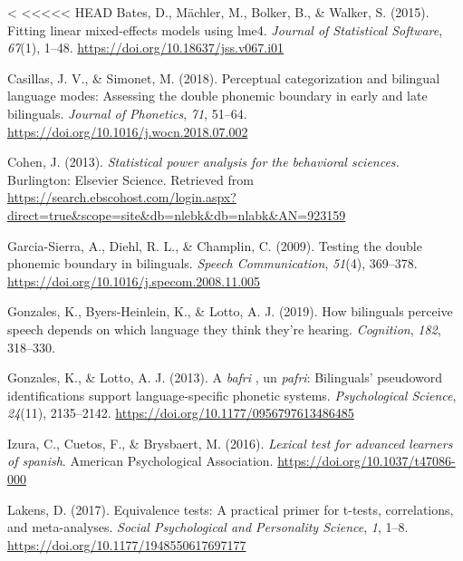 \documentclass[
  english,
  man]{apa6}
\newlength{\cslhangindent}
\newenvironment{CSLReferences}[2] %
 {%
  \setlength{\parindent}{0pt}
  \ifodd #1 \everypar{\setlength{\hangindent}{\cslhangindent}}\ignorespaces\fi
  \ifnum #2 > 0
  \setlength{\parskip}{#2\baselineskip}
  \fi
 }%
 {}
\begin{document}
\hypertarget{refs}{}
\begin{CSLReferences}{1}{0}
<<<<<<< HEAD
\leavevmode{}%
Bates, D., Mächler, M., Bolker, B., \& Walker, S. (2015). Fitting linear mixed-effects models using {lme4}. \emph{Journal of Statistical Software}, \emph{67}(1), 1--48. \url{https://doi.org/10.18637/jss.v067.i01}

\leavevmode{}%
Casillas, J. V., \& Simonet, M. (2018). Perceptual categorization and bilingual language modes: Assessing the double phonemic boundary in early and late bilinguals. \emph{Journal of Phonetics}, \emph{71}, 51--64. \url{https://doi.org/10.1016/j.wocn.2018.07.002}

\leavevmode{}%
Cohen, J. (2013). \emph{Statistical power analysis for the behavioral sciences.} Burlington: Elsevier Science. Retrieved from \url{https://search.ebscohost.com/login.aspx?direct=true\&scope=site\&db=nlebk\&db=nlabk\&AN=923159}

\leavevmode{}%
Garcia-Sierra, A., Diehl, R. L., \& Champlin, C. (2009). Testing the double phonemic boundary in bilinguals. \emph{Speech Communication}, \emph{51}(4), 369--378. \url{https://doi.org/10.1016/j.specom.2008.11.005}

\leavevmode{}%
Gonzales, K., Byers-Heinlein, K., \& Lotto, A. J. (2019). How bilinguals perceive speech depends on which language they think they're hearing. \emph{Cognition}, \emph{182}, 318--330.

\leavevmode{}%
Gonzales, K., \& Lotto, A. J. (2013). A \emph{bafri} , un \emph{pafri}: Bilinguals' pseudoword identifications support language-specific phonetic systems. \emph{Psychological Science}, \emph{24}(11), 2135--2142. \url{https://doi.org/10.1177/0956797613486485}

\leavevmode{}%
Izura, C., Cuetos, F., \& Brysbaert, M. (2016). \emph{Lexical test for advanced learners of spanish}. American Psychological Association. \url{https://doi.org/10.1037/t47086-000}

\leavevmode{}%
Lakens, D. (2017). Equivalence tests: A practical primer for t-tests, correlations, and meta-analyses. \emph{Social Psychological and Personality Science}, \emph{1}, 1--8. \url{https://doi.org/10.1177/1948550617697177}


\end{CSLReferences}
\end{document}
